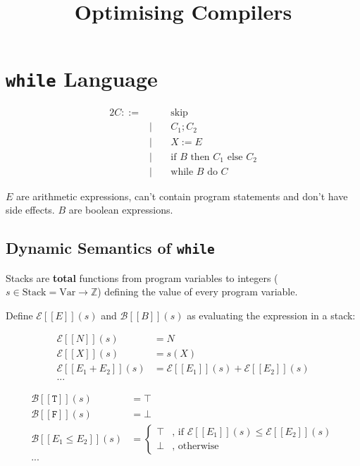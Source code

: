 \documentclass[a4paper, 11pt]{article}
\title{\vspace{-2.5cm}Optimising Compilers\vspace{-2cm}}
\author{}
\date{}
\newcommand{\interp}[2][]{\mathcal{#1}[\![#2]\!]}
\begin{document}
\maketitle
\section*{\texttt{while} Language}
{
    \begin{minipage}[t]{0.4\textwidth}
    \vspace{-7mm}
    \begin{alignat*}{2}
    C ::=& \; &\;&\text{skip} \\
         & | &&C_1 ; C_2 \\
         & | &&X := E \\
         & | &&\text{if }B\text{ then }C_1\text{ else }C_2 \\
         & | &&\text{while }B\text{ do }C
    \end{alignat*}
    \end{minipage}
    \begin{minipage}[t]{0.5\textwidth}
    \(E\) are arithmetic expressions, can't contain program statements and don't have side effects. \(B\) are boolean expressions.
    \end{minipage}

    \subsection*{Dynamic Semantics of \texttt{while}}
    {
        Stacks are \textbf{total} functions from program variables to integers (\(s \in \text{Stack} = \text{Var} \rightarrow \mathbb{Z}\)) defining the value of every program variable.

        Define \(\interp[E]{E}(s)\) and \(\interp[B]{B}(s)\) as evaluating the expression in a stack:

        \begin{minipage}[t]{0.48\textwidth}
        \begin{align*}
        \interp[E]{N}(s) &= N \\
        \interp[E]{X}(s) &= s(X) \\
        \interp[E]{E_1 + E_2}(s) &= \interp[E]{E_1}(s) + \interp[E]{E_2}(s) \\
        ...
        \end{align*}
        \end{minipage}
        \begin{minipage}[t]{0.48\textwidth}
        \begin{align*}
        \interp[B]{\texttt{T}}(s) &= \top \\
        \interp[B]{\texttt{F}}(s) &= \bot \\
        \interp[B]{E_1 \leq E_2}(s) &= \begin{cases}
            \top & \text{, if }\interp[E]{E_1}(s) \leq \interp[E]{E_2}(s) \\
            \bot & \text{, otherwise}
        \end{cases} \\
        ...
        \end{align*}
        \end{minipage}

}}
\end{document}
